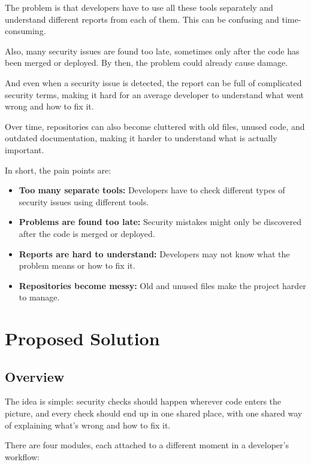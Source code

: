 \documentclass[12pt,a4paper]{article}
\begin{document}
The problem is that developers have to use all these tools separately and understand different reports from each of them. This can be confusing and time-consuming.

Also, many security issues are found too late, sometimes only after the code has been merged or deployed. By then, the problem could already cause damage.

And even when a security issue is detected, the report can be full of complicated security terms, making it hard for an average developer to understand what went wrong and how to fix it.

Over time, repositories can also become cluttered with old files, unused code, and outdated documentation, making it harder to understand what is actually important.

In short, the pain points are:

\begin{itemize}
    \item \textbf{Too many separate tools:} Developers have to check different types of security issues using different tools.

    \item \textbf{Problems are found too late:} Security mistakes might only be discovered after the code is merged or deployed.

    \item \textbf{Reports are hard to understand:} Developers may not know what the problem means or how to fix it.

    \item \textbf{Repositories become messy:} Old and unused files make the project harder to manage.
\end{itemize}

\section{Proposed Solution}

\subsection{Overview}

The idea is simple: security checks should happen wherever code enters the picture, and every check should end up in one shared place, with one shared way of explaining what's wrong and how to fix it.

There are four modules, each attached to a different moment in a developer's workflow:
\end{document}
